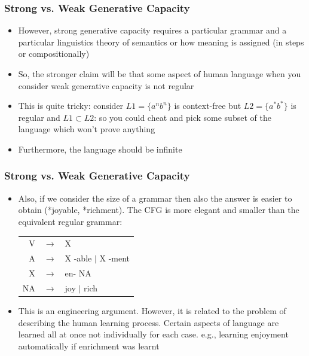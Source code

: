 \documentclass[compress,color=usenames]{beamer}
\begin{document}
\begin{frame}
\frametitle{Strong vs. Weak Generative Capacity}

\begin{itemize}
\item However, strong generative capacity requires a particular grammar and a
particular linguistics theory of semantics or how meaning is assigned (in
steps or compositionally)

\item So, the stronger claim will be that some aspect of human language when
you consider weak generative capacity is not regular

\item This is quite tricky: consider 
$L1 = \{a^nb^n\}$ is context-free but $L2 = \{a^*b^*\}$ is
regular and $L1 \subset L2$: so you could cheat and pick some subset of the
language which won't prove anything

\item Furthermore, the language should be infinite
\end{itemize}

\end{frame}

\begin{frame}
\frametitle{Strong vs. Weak Generative Capacity}

\begin{itemize}
\item Also, if we consider the size of a grammar then also the answer is easier
to obtain (*joyable, *richment). The CFG is more elegant and smaller
than the equivalent regular grammar:

\begin{center}
\begin{tabular}{rcl}
 V & $\rightarrow$ & X\\

 A & $\rightarrow$ & X -able $\mid$ X -ment\\

 X & $\rightarrow$ & en- NA\\

NA & $\rightarrow$ & joy $\mid$ rich\\
\end{tabular}
\end{center}

\item This is an engineering argument. However, it is related to the problem of
describing the human learning process. Certain aspects of language are
learned all at once not individually for each case.
e.g., learning enjoyment automatically if enrichment was learnt
\end{itemize}

\end{frame}
\end{document}
